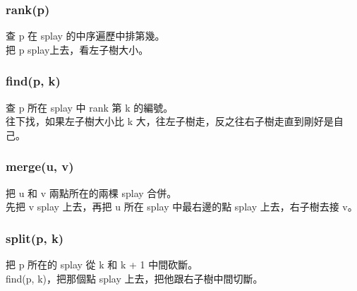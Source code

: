            \subsubsection{rank(p)}
            查 p 在 splay 的中序遍歷中排第幾。\\
            把 p splay上去，看左子樹大小。
            \subsubsection{find(p, k)}
            查 p 所在 splay 中 rank 第 k 的編號。\\
            往下找，如果左子樹大小比 k 大，往左子樹走，反之往右子樹走直到剛好是自己。
            \subsubsection{merge(u, v)}
            把 u 和 v 兩點所在的兩棵 splay 合併。\\
            先把 v splay 上去，再把 u 所在 splay 中最右邊的點 splay 上去，右子樹去接 v。
            \subsubsection{split(p, k)}
            把 p 所在的 splay 從 k 和 k + 1 中間砍斷。\\
            find(p, k)，把那個點 splay 上去，把他跟右子樹中間切斷。
